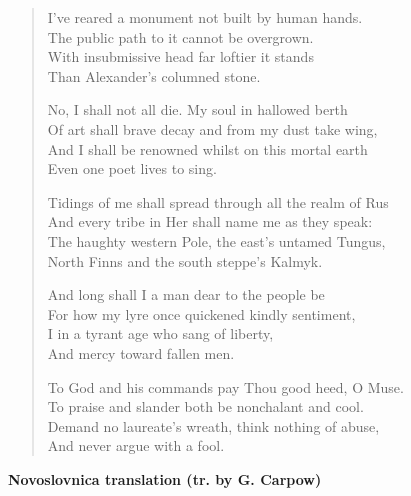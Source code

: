 \begin{verse}
	I've reared a monument not built by human hands. \\
	The public path to it cannot be overgrown. \\
	With insubmissive head far loftier it stands \\
	Than Alexander's columned stone.
	
	No, I shall not all die. My soul in hallowed berth \\
	Of art shall brave decay and from my dust take wing, \\
	And I shall be renowned whilst on this mortal earth \\
	Even one poet lives to sing.
	
	Tidings of me shall spread through all the realm of Rus \\
	And every tribe in Her shall name me as they speak: \\
	The haughty western Pole, the east's untamed Tungus, \\
	North Finns and the south steppe's Kalmyk.
	
	And long shall I a man dear to the people be \\
	For how my lyre once quickened kindly sentiment, \\
	I in a tyrant age who sang of liberty, \\
	And mercy toward fallen men.
	
	To God and his commands pay Thou good heed, O Muse. \\
	To praise and slander both be nonchalant and cool. \\
	Demand no laureate's wreath, think nothing of abuse, \\
	And never argue with a fool.
\end{verse}

\textbf{Novoslovnica translation (tr. by G. Carpow)}

